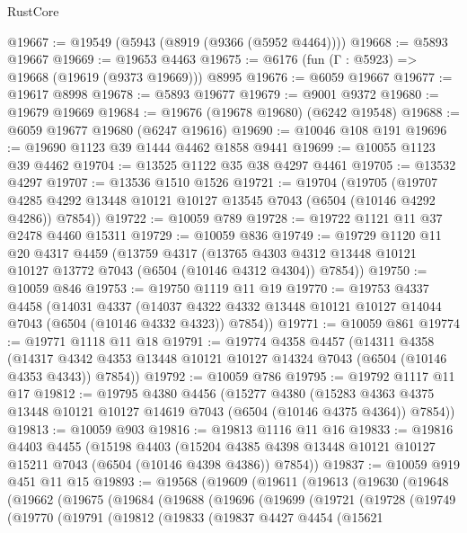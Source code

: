 \begin{lexlean}{RustCore}
\begin{coremodule}
@19667 := @19549 (@5943 (@8919 (@9366 (@5952 @4464))))
@19668 := @5893 @19667
@19669 := @19653 @4463
@19675 := @6176 (fun (Γ : @5923) => @19668 (@19619 (@9373 @19669))) @8995
@19676 := @6059 @19667
@19677 := @19617 @8998
@19678 := @5893 @19677
@19679 := @9001 @9372
@19680 := @19679 @19669
@19684 := @19676 (@19678 @19680) (@6242 @19548)
@19688 := @6059 @19677 @19680 (@6247 @19616)
@19690 := @10046 @108 @191
@19696 := @19690 @1123 @39 @1444 @4462 @1858 @9441
@19699 := @10055 @1123 @39 @4462
@19704 := @13525 @1122 @35 @38 @4297 @4461
@19705 := @13532 @4297
@19707 := @13536 @1510 @1526
@19721 := @19704
    (@19705
      (@19707 @4285 @4292 @13448 @10121 @10127 @13545 @7043 (@6504 (@10146 @4292 @4286)) @7854))
@19722 := @10059 @789
@19728 := @19722 @1121 @11 @37 @2478 @4460 @15311
@19729 := @10059 @836
@19749 := @19729
    @1120
    @11
    @20
    @4317
    @4459
    (@13759
      @4317
      (@13765 @4303 @4312 @13448 @10121 @10127 @13772 @7043 (@6504 (@10146 @4312 @4304)) @7854))
@19750 := @10059 @846
@19753 := @19750 @1119 @11 @19
@19770 := @19753
    @4337
    @4458
    (@14031
      @4337
      (@14037 @4322 @4332 @13448 @10121 @10127 @14044 @7043 (@6504 (@10146 @4332 @4323)) @7854))
@19771 := @10059 @861
@19774 := @19771 @1118 @11 @18
@19791 := @19774
    @4358
    @4457
    (@14311
      @4358
      (@14317 @4342 @4353 @13448 @10121 @10127 @14324 @7043 (@6504 (@10146 @4353 @4343)) @7854))
@19792 := @10059 @786
@19795 := @19792 @1117 @11 @17
@19812 := @19795
    @4380
    @4456
    (@15277
      @4380
      (@15283 @4363 @4375 @13448 @10121 @10127 @14619 @7043 (@6504 (@10146 @4375 @4364)) @7854))
@19813 := @10059 @903
@19816 := @19813 @1116 @11 @16
@19833 := @19816
    @4403
    @4455
    (@15198
      @4403
      (@15204 @4385 @4398 @13448 @10121 @10127 @15211 @7043 (@6504 (@10146 @4398 @4386)) @7854))
@19837 := @10059 @919 @451 @11 @15
@19893 := @19568
    (@19609
      (@19611
        (@19613
          (@19630
            (@19648
              (@19662
                (@19675
                  (@19684
                    (@19688
                      (@19696
                        (@19699
                          (@19721
                            (@19728
                              (@19749
                                (@19770
                                  (@19791
                                    (@19812
                                      (@19833
                                        (@19837
                                          @4427
                                          @4454
                                          (@15621

\end{coremodule}
\end{lexlean}

